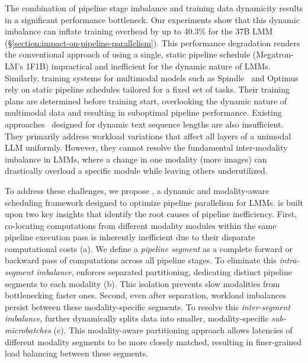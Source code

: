 The combination of pipeline stage imbalance and training data dynamicity results in a significant performance bottleneck. Our experiments show that this dynamic imbalance can inflate training overhead by up to 40.3\% for the 37B LMM (\S\ref{section:impact-on-pipeline-parallelism}).
This performance degradation renders the conventional approach of using a single, static pipeline schedule (\eg Megatron-LM's 1F1B) impractical and inefficient for the dynamic nature of LMMs.
Similarly, training systems for multimodal models such as Spindle~\cite{spindle-asplos25} and Optimus~\cite{optimus-atc25} rely on static pipeline schedules tailored for a fixed set of tasks.
Their training plans are determined before training start, overlooking the dynamic nature of multimodal data and resulting in suboptimal pipeline performance.
Existing approaches~\cite{wlb-llm-osdi25,dynapipe-eurosys24,flexpipe-atc25} designed for dynamic text sequence lengths are also insufficient.
They primarily address workload variations that affect all layers of a unimodal LLM uniformly.
However, they cannot resolve the fundamental inter-modality imbalance in LMMs,
where a change in one modality (\eg more images) can drastically overload a specific module while leaving others underutilized.

To address these challenges, we propose \sys{}, a dynamic and modality-aware scheduling framework designed to optimize pipeline parallelism for LMMs. \sys{} is built upon two key insights that identify the root causes of pipeline inefficiency.
First, co-locating computations from different modality modules within the same pipeline execution pass is inherently inefficient due to their disparate computational costs (a).
We define a \emph{pipeline segment} as a complete forward or backward pass of computations across all pipeline stages.
To eliminate this \emph{intra-segment imbalance}, \sys{} enforces separated partitioning, dedicating distinct pipeline segments to each modality (b).
This isolation prevents slow modalities from bottlenecking faster ones.
Second, even after separation, workload imbalances persist between these modality-specific segments.
To resolve this \emph{inter-segment imbalance}, \sys{} further dynamically splits data into smaller, modality-specific \emph{sub-microbatches} (c).
This modality-aware partitioning approach allows latencies of different modality segments to be more closely matched,
resulting in finer-grained load balancing between these segments.

